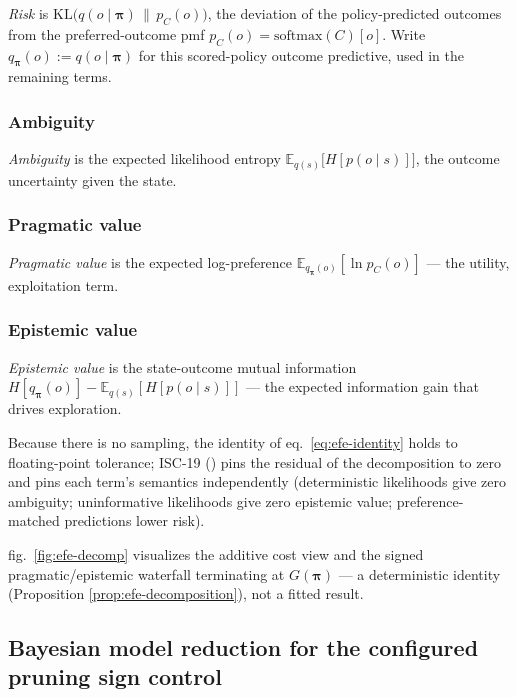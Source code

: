 \documentclass[
  english,
]{article}
\theoremstyle{plain}
\theoremstyle{definition}
\theoremstyle{remark}
\theoremstyle{definition}
\begin{document}
\emph{Risk} is
\(\mathrm{KL}\big(q(o\mid\boldsymbol{\pi})\,\|\,p_C(o)\big)\), the
deviation of the policy-predicted outcomes from the preferred-outcome
pmf \(p_C(o)=\mathrm{softmax}(C)[o]\). Write
\(q_{\boldsymbol{\pi}}(o):=q(o\mid\boldsymbol{\pi})\) for this
scored-policy outcome predictive, used in the remaining terms.

\subsubsection{Ambiguity}\label{ambiguity}

\emph{Ambiguity} is the expected likelihood entropy
\(\mathbb{E}_{q(s)}\!\big[H[p(o\mid s)]\big]\), the outcome uncertainty
given the state.

\subsubsection{Pragmatic value}\label{pragmatic-value}

\emph{Pragmatic value} is the expected log-preference
\(\mathbb{E}_{q_{\boldsymbol{\pi}}(o)}[\ln p_C(o)]\) --- the utility,
exploitation term.

\subsubsection{Epistemic value}\label{epistemic-value}

\emph{Epistemic value} is the state-outcome mutual information
\(H[q_{\boldsymbol{\pi}}(o)] - \mathbb{E}_{q(s)}[H[p(o\mid s)]]\) ---
the expected information gain that drives exploration.

Because there is no sampling, the identity of eq.~\ref{eq:efe-identity}
holds to floating-point tolerance; ISC-19
() pins the residual of the decomposition
to zero and pins each term's semantics independently (deterministic
likelihoods give zero ambiguity; uninformative likelihoods give zero
epistemic value; preference-matched predictions lower risk).

fig.~\ref{fig:efe-decomp} visualizes the additive cost view and the
signed pragmatic/epistemic waterfall terminating at
\(G(\boldsymbol{\pi})\) --- a deterministic identity (Proposition
\ref{prop:efe-decomposition}), not a fitted result.

\subsection{Bayesian model reduction for the configured pruning sign
control}\label{sec:methods-bmr}
\end{document}
